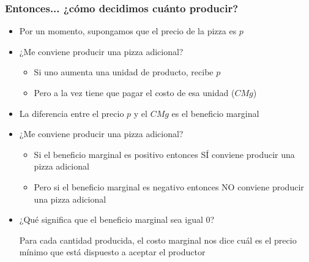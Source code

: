 \documentclass{beamer}
\begin{document}
\begin{frame}
\frametitle{Entonces... ¿cómo decidimos cuánto producir?}
    \begin{itemize}
        \item Por un momento, supongamos que el precio de la pizza es $p$
            \item ¿Me conviene producir una pizza adicional?  
        \begin{itemize}
            \item Si uno aumenta una unidad de producto, recibe $p$
            \item Pero a la vez tiene que pagar el costo de esa unidad ($CMg$)
        \end{itemize}
        \item La diferencia entre el precio $p$ y el $CMg$ es el beneficio marginal
        \item ¿Me conviene producir una pizza adicional?
        \begin{itemize}
            \item Si el beneficio marginal es positivo entonces SÍ conviene producir una pizza adicional
            \item Pero si el beneficio marginal es negativo entonces NO conviene producir una pizza adicional
        \end{itemize} 
        \item ¿Qué significa que el beneficio marginal sea igual 0?
        \begin{boxB}
            \centering
            Para cada cantidad producida, el costo marginal nos dice cuál es el precio mínimo que está dispuesto a aceptar el productor
        \end{boxB}
    \end{itemize}
\end{frame}
\end{document}
